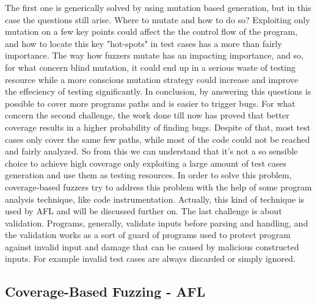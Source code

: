 The first one is generically solved by using mutation based generation, but in this case the questions still
arise. Where to mutate and how to do so? Exploiting only mutation on a few key points could affect the the control flow of the program, and how to locate this key "hot-spots" in test cases has a more than fairly importance.
The way how fuzzers mutate has an impacting importance, and so, for what concern blind mutation, it could end up in a serious waste of testing resource while a more conscious mutation strategy could increase and improve the effeciency
of testing significantly. In conclusion, by answering this questions is possible to cover more programs paths and is easier to trigger bugs.
For what concern the second challenge, the work done till now has proved that better coverage results in a higher probability of finding bugs. Despite of that, 
most test cases only cover the same few paths, while most of the code could not be reached and fairly analyzed. So from this we can understand that
it's not a so sensible choice to achieve high coverage only exploiting a large amount of test cases generation and use them as testing resources.
In order to solve this problem, coverage-based fuzzers try to address this problem with the help of some program analysis technique, like code instrumentation. Actually,
this kind of technique is used by AFL and will be discussed further on. 
The last challenge is about validation. Programs, generally, validate inputs before parsing and handling, and the validation works as a sort of guard of programs used to protect program against invalid input and damage that can be caused by malicious constructed
inputs. For example invalid test cases are always discarded or simply ignored.


\subsection{Coverage-Based Fuzzing - AFL}

